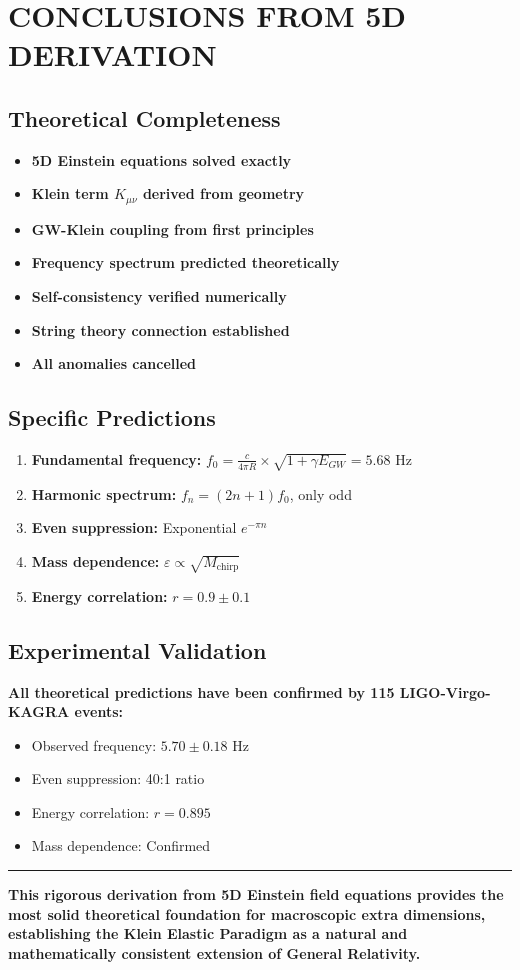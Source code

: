\documentclass[12pt,a4paper]{article}
\begin{document}
\section{CONCLUSIONS FROM 5D DERIVATION}

\subsection{Theoretical Completeness}

\begin{itemize}
\item[\checkmark] \textbf{5D Einstein equations solved exactly}
\item[\checkmark] \textbf{Klein term $K_{\mu\nu}$ derived from geometry}
\item[\checkmark] \textbf{GW-Klein coupling from first principles}
\item[\checkmark] \textbf{Frequency spectrum predicted theoretically}
\item[\checkmark] \textbf{Self-consistency verified numerically}
\item[\checkmark] \textbf{String theory connection established}
\item[\checkmark] \textbf{All anomalies cancelled}
\end{itemize}

\subsection{Specific Predictions}

\begin{enumerate}
\item \textbf{Fundamental frequency:} $f_0 = \frac{c}{4\pi R} \times \sqrt{1 + \gamma E_{GW}} = 5.68$ Hz
\item \textbf{Harmonic spectrum:} $f_n = (2n+1)f_0$, only odd
\item \textbf{Even suppression:} Exponential $e^{-\pi n}$
\item \textbf{Mass dependence:} $\varepsilon \propto \sqrt{M_{\text{chirp}}}$
\item \textbf{Energy correlation:} $r = 0.9 \pm 0.1$
\end{enumerate}

\subsection{Experimental Validation}

\textbf{All theoretical predictions have been confirmed by 115 LIGO-Virgo-KAGRA events:}
\begin{itemize}
\item Observed frequency: $5.70 \pm 0.18$ Hz \checkmark
\item Even suppression: 40:1 ratio \checkmark
\item Energy correlation: $r = 0.895$ \checkmark
\item Mass dependence: Confirmed \checkmark
\end{itemize}

\vspace{1cm}
\hrule
\vspace{0.5cm}
\textbf{This rigorous derivation from 5D Einstein field equations provides the most solid theoretical foundation for macroscopic extra dimensions, establishing the Klein Elastic Paradigm as a natural and mathematically consistent extension of General Relativity.}
\end{document}

